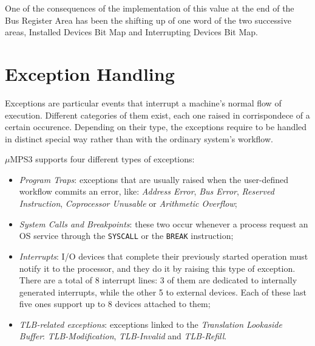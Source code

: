 \documentclass[12pt,a4paper,openright,twoside]{report}
\begin{document}
One of the consequences of the implementation of this value at the end of the Bus Register Area has been the shifting up of one word of the two successive areas, Installed Devices Bit Map and Interrupting Devices Bit Map.

\chapter{Exception Handling}
\label{chap:exception_handling}
\lhead[\fancyplain{}{\bfseries\thepage}]{\fancyplain{}{\bfseries\rightmark}}
Exceptions are particular events that interrupt a machine's normal flow of execution.
Different categories of them exist, each one raised in corrispondece of a certain occurence.
Depending on their type, the exceptions require to be handled in distinct special way rather than with the ordinary system's workflow.

$\mu$MPS3 supports four different types of exceptions:
\begin{itemize}
	\item \textit{Program Traps}: exceptions that are usually raised when the user-defined workflow commits an error, like: \textit{Address Error}, \textit{Bus Error}, \textit{Reserved Instruction}, \textit{Coprocessor Unusable} or \textit{Arithmetic Overflow};
	\item \textit{System Calls and Breakpoints}: these two occur whenever a process request an OS service through the \texttt{SYSCALL} or the \texttt{BREAK} instruction;
	\item \textit{Interrupts}: I/O devices that complete their previously started operation must notify it to the processor, and they do it by raising this type of exception. There are a total of 8 interrupt lines: 3 of them are dedicated to internally generated interrupts, while the other 5 to external devices. Each of these last five ones support up to 8 devices attached to them;
	\item \textit{TLB-related exceptions}: exceptions linked to the \textit{Translation Lookaside Buffer}: \textit{TLB-Modification}, \textit{TLB-Invalid} and \textit{TLB-Refill}.
\end{itemize}
\end{document}
